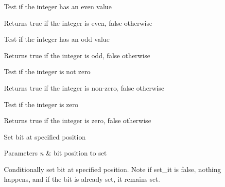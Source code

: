 Test if the integer has an even value \begin{DoxyReturn}{Returns}
true if the integer is even, false otherwise
\end{DoxyReturn}
Test if the integer has an odd value \begin{DoxyReturn}{Returns}
true if the integer is odd, false otherwise
\end{DoxyReturn}
Test if the integer is not zero \begin{DoxyReturn}{Returns}
true if the integer is non-\/zero, false otherwise
\end{DoxyReturn}
Test if the integer is zero \begin{DoxyReturn}{Returns}
true if the integer is zero, false otherwise
\end{DoxyReturn}
Set bit at specified position 
\begin{DoxyParams}{Parameters}
{\em n} & bit position to set\\
\hline
\end{DoxyParams}
Conditionally set bit at specified position. Note if set\+\_\+it is false, nothing happens, and if the bit is already set, it remains set.


